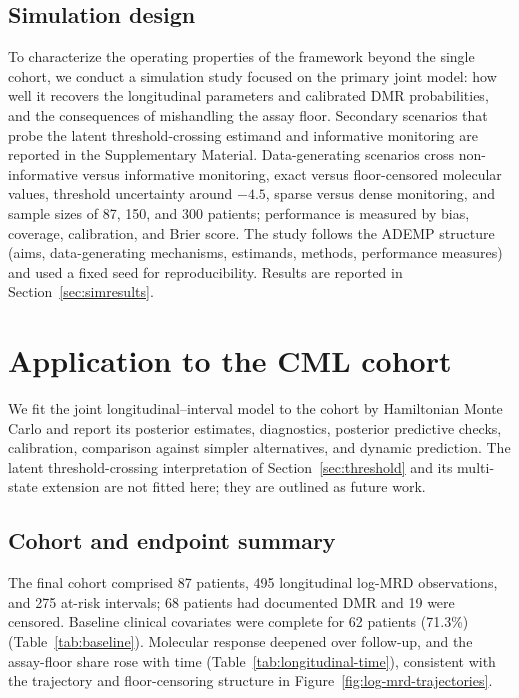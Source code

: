 \documentclass[11pt]{article}
\begin{document}
\subsection{Simulation design}
\label{sec:sim}

To characterize the operating properties of the framework beyond the
single cohort, we conduct a simulation study focused on the primary joint model: how well
it recovers the longitudinal parameters and calibrated DMR probabilities, and
the consequences of mishandling the assay floor. Secondary scenarios that
probe the latent threshold-crossing estimand and informative monitoring are
reported in the Supplementary Material. Data-generating
scenarios cross non-informative versus informative monitoring, exact
versus floor-censored molecular values, threshold uncertainty around
$-4.5$, sparse versus dense monitoring, and sample sizes of 87, 150, and
300 patients; performance is measured by bias, coverage, calibration, and
Brier score. The study follows the ADEMP structure (aims, data-generating
mechanisms, estimands, methods, performance measures) and used a fixed seed
for reproducibility. Results are reported in Section~\ref{sec:simresults}.

\section{Application to the CML cohort}
\label{sec:application}

We fit the joint longitudinal--interval model to the cohort by Hamiltonian
Monte Carlo and report its posterior estimates, diagnostics, posterior
predictive checks, calibration, comparison against simpler alternatives, and
dynamic prediction. The latent threshold-crossing interpretation of
Section~\ref{sec:threshold} and its multi-state extension are not fitted
here; they are outlined as future work.

\subsection{Cohort and endpoint summary}

The final cohort comprised 87 patients, 495 longitudinal log-MRD
observations, and 275 at-risk intervals; 68 patients had documented DMR
and 19 were censored. Baseline clinical covariates were complete for 62
patients (71.3\%) (Table~\ref{tab:baseline}). Molecular response deepened
over follow-up, and the assay-floor share rose with time
(Table~\ref{tab:longitudinal-time}), consistent with the trajectory and
floor-censoring structure in Figure~\ref{fig:log-mrd-trajectories}.
\end{document}
